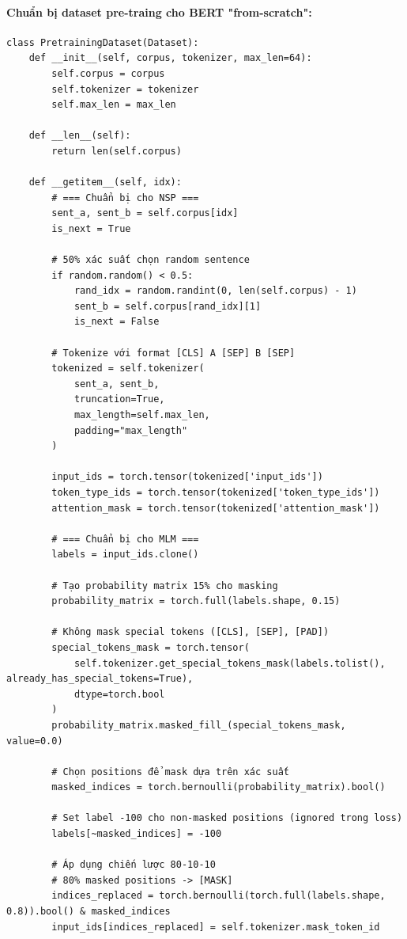 \paragraph{Chuẩn bị dataset pre-traing cho BERT "from-scratch":}
\begin{verbatim}
class PretrainingDataset(Dataset):
    def __init__(self, corpus, tokenizer, max_len=64):
        self.corpus = corpus
        self.tokenizer = tokenizer
        self.max_len = max_len

    def __len__(self):
        return len(self.corpus)

    def __getitem__(self, idx):
        # === Chuẩn bị cho NSP ===
        sent_a, sent_b = self.corpus[idx]
        is_next = True
        
        # 50% xác suất chọn random sentence
        if random.random() < 0.5:
            rand_idx = random.randint(0, len(self.corpus) - 1)
            sent_b = self.corpus[rand_idx][1]
            is_next = False

        # Tokenize với format [CLS] A [SEP] B [SEP]
        tokenized = self.tokenizer(
            sent_a, sent_b, 
            truncation=True, 
            max_length=self.max_len, 
            padding="max_length"
        )
        
        input_ids = torch.tensor(tokenized['input_ids'])
        token_type_ids = torch.tensor(tokenized['token_type_ids'])
        attention_mask = torch.tensor(tokenized['attention_mask'])

        # === Chuẩn bị cho MLM ===
        labels = input_ids.clone()
        
        # Tạo probability matrix 15% cho masking
        probability_matrix = torch.full(labels.shape, 0.15)
        
        # Không mask special tokens ([CLS], [SEP], [PAD])
        special_tokens_mask = torch.tensor(
            self.tokenizer.get_special_tokens_mask(labels.tolist(), already_has_special_tokens=True), 
            dtype=torch.bool
        )
        probability_matrix.masked_fill_(special_tokens_mask, value=0.0)
        
        # Chọn positions để mask dựa trên xác suất
        masked_indices = torch.bernoulli(probability_matrix).bool()
        
        # Set label -100 cho non-masked positions (ignored trong loss)
        labels[~masked_indices] = -100

        # Áp dụng chiến lược 80-10-10
        # 80% masked positions -> [MASK]
        indices_replaced = torch.bernoulli(torch.full(labels.shape, 0.8)).bool() & masked_indices
        input_ids[indices_replaced] = self.tokenizer.mask_token_id


\end{verbatim}
